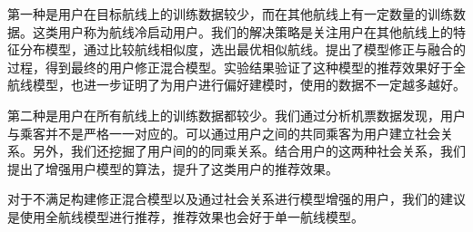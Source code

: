 第一种是用户在目标航线上的训练数据较少，而在其他航线上有一定数量的训练数据。这类用户称为航线冷启动用户。我们的解决策略是关注用户在其他航线上的特征分布模型，通过比较航线相似度，选出最优相似航线。提出了模型修正与融合的过程，得到最终的用户修正混合模型。实验结果验证了这种模型的推荐效果好于全航线模型，也进一步证明了为用户进行偏好建模时，使用的数据不一定越多越好。

第二种是用户在所有航线上的训练数据都较少。我们通过分析机票数据发现，用户与乘客并不是严格一一对应的。可以通过用户之间的共同乘客为用户建立社会关系。另外，我们还挖掘了用户间的的同乘关系。结合用户的这两种社会关系，我们提出了增强用户模型的算法，提升了这类用户的推荐效果。

对于不满足构建修正混合模型以及通过社会关系进行模型增强的用户，我们的建议是使用全航线模型进行推荐，推荐效果也会好于单一航线模型。